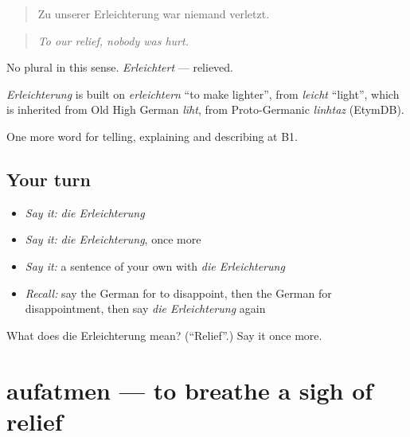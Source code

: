 \begin{quote}
Zu unserer Erleichterung war niemand verletzt.
\end{quote}

\begin{quote}
\emph{To our relief, nobody was hurt.}
\end{quote}

No plural in this sense. \emph{Erleichtert} — relieved.

\begin{cousinweb}
\emph{Erleichterung} is built on \emph{erleichtern} \textquotedblleft{}to make lighter\textquotedblright{}, from \emph{leicht} \textquotedblleft{}light\textquotedblright{}, which is inherited from Old High German \emph{līht}, from Proto-Germanic \emph{linhtaz} (EtymDB).
\end{cousinweb}

\begin{grammarlens}[title={What you've built}]
One more word for telling, explaining and describing at B1.
\end{grammarlens}

\subsection*{Your turn}
\begin{itemize}
\raggedright
  \item \emph{Say it:} \emph{die Erleichterung}
  \item \emph{Say it:} \emph{die Erleichterung}, once more
  \item \emph{Say it:} a sentence of your own with \emph{die Erleichterung}
  \item \emph{Recall:} say the German for to disappoint, then the German for disappointment, then say \emph{die Erleichterung} again
\end{itemize}

\begin{tcolorbox}[breakable,colback=teal!4,colframe=teal!35!black,title={Before you move on}]
What does die Erleichterung mean? (\textquotedblleft{}Relief\textquotedblright{}.) Say it once more.
\end{tcolorbox}
\section[aufatmen]{aufatmen — to breathe a sigh of relief}

\label{lesson:GE-C469-aufatmen}



